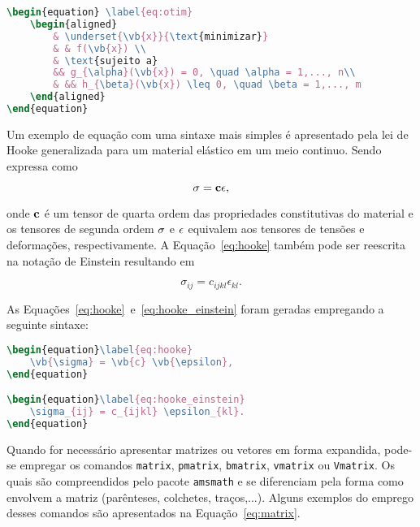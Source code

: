\begin{lstlisting}[language=TeX, frame=lines, lineskip={-0.75pt}, basicstyle=\scriptsize]
\begin{equation} \label{eq:otim}
	\begin{aligned}
		& \underset{\vb{x}}{\text{minimizar}}
		& & f(\vb{x}) \\
		& \text{sujeito a}
		&& g_{\alpha}(\vb{x}) = 0, \quad \alpha = 1,..., n\\
		& && h_{\beta}(\vb{x}) \leq 0, \quad \beta = 1,..., m
	\end{aligned}
\end{equation}
\end{lstlisting}

Um exemplo de equação com uma sintaxe mais simples é apresentado pela lei de Hooke generalizada para um material elástico em um meio continuo. Sendo expressa como

\begin{equation}\label{eq:hooke}
	\vb{\sigma} = \vb{c} \vb{\epsilon},
\end{equation}
	
\noindent onde $\vb{c}$ é um tensor de quarta ordem das propriedades constitutivas do material e os tensores de segunda ordem $\vb{\sigma}$ e $\vb{\epsilon}$ equivalem aos tensores de tensões e deformações, respectivamente. A Equação~\ref{eq:hooke} também pode ser reescrita na notação de Einstein resultando em

\begin{equation}\label{eq:hooke_einstein}
	\sigma_{ij} = c_{ijkl} \epsilon_{kl}.
\end{equation}

As Equações~\ref{eq:hooke}~e~\ref{eq:hooke_einstein} foram geradas empregando a seguinte sintaxe:

\begin{lstlisting}[language=TeX, frame=lines, lineskip={-0.75pt}, basicstyle=\scriptsize]
\begin{equation}\label{eq:hooke}
	\vb{\sigma} = \vb{c} \vb{\epsilon},
\end{equation}

\begin{equation}\label{eq:hooke_einstein}
	\sigma_{ij} = c_{ijkl} \epsilon_{kl}.
\end{equation}
\end{lstlisting}

Quando for necessário apresentar matrizes ou vetores em forma expandida, pode-se empregar os comandos \verb|matrix|, \verb|pmatrix|, \verb|bmatrix|, \verb|vmatrix| ou \verb|Vmatrix|. Os quais são compreendidos pelo pacote \verb|amsmath| e se diferenciam pela forma como envolvem a matriz (parênteses, colchetes, traços,...). Alguns exemplos do emprego desses comandos são apresentados na Equação~\ref{eq:matrix}.

